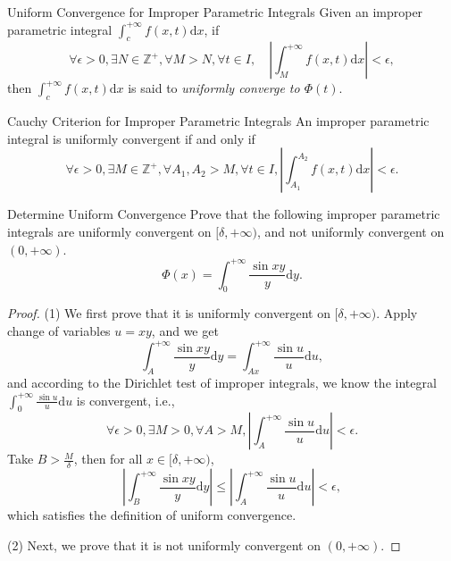 \begin{definition}{Uniform Convergence for Improper Parametric Integrals}{}
  Given an improper parametric integral $\int_c^{+\infty}f(x, t)\mathrm{d} x$, if
  \begin{equation}
    \forall \epsilon > 0, \exists N \in \mathbb{Z}^+, \forall M > N, \forall t \in I, \quad
    \left| \int_M^{+\infty} f(x, t)\mathrm{d} x \right| < \epsilon,
  \end{equation}
  then $\int_c^{+\infty}f(x, t)\mathrm{d} x$ is said to \emph{uniformly converge
  to $\Phi(t)$}.
\end{definition}

\begin{proposition}{Cauchy Criterion for Improper Parametric Integrals}{}
  An improper parametric integral is uniformly convergent if and only if
  \begin{equation}
    \forall \epsilon > 0, \exists M \in \mathbb{Z}^+,
    \forall A_1, A_2 > M, \forall t \in I,
    \left| \int_{A_1}^{A_2}f(x,t)\mathrm{d}x \right| < \epsilon.
  \end{equation}
\end{proposition}

\begin{example}{Determine Uniform Convergence}{}
  Prove that the following improper parametric integrals are
  uniformly convergent on $[\delta, +\infty)$, and not uniformly convergent
  on $(0, +\infty)$.
  \begin{equation}
    \Phi(x) = \int_0^{+\infty} \frac{\sin xy}{y} \mathrm{d} y.
  \end{equation}
\end{example}

\begin{proof}
  (1) We first prove that it is uniformly convergent on $[\delta, +\infty)$.
  Apply change of variables $u = xy$, and we get
  \begin{equation}
    \int_A^{+\infty} \frac{\sin xy}{y} \mathrm{d} y = \int_{Ax}^{+\infty} \frac{\sin u}{u} \mathrm{d} u,
  \end{equation}
  and according to the Dirichlet test of improper integrals, we know the integral
  $\int_0^{+\infty} \frac{\sin u}{u} \mathrm{d} u$ is convergent, i.e.,
  \begin{equation}
    \forall \epsilon > 0, \exists M > 0, \forall A > M,
    \left| \int_A^{+\infty} \frac{\sin u}{u} \mathrm{d} u \right| < \epsilon.
  \end{equation}
  Take $B > \frac{M}{\delta}$, then for all $x \in [\delta, +\infty)$,
  \begin{equation}
    \left| \int_B^{+\infty} \frac{\sin xy}{y}\mathrm{d} y \right|
    \leq \left| \int_A^{+\infty} \frac{\sin u}{u} \mathrm{d} u \right| < \epsilon,
  \end{equation}
  which satisfies the definition of uniform convergence.

  (2) Next, we prove that it is not uniformly convergent on $(0, +\infty)$.
\end{proof}

